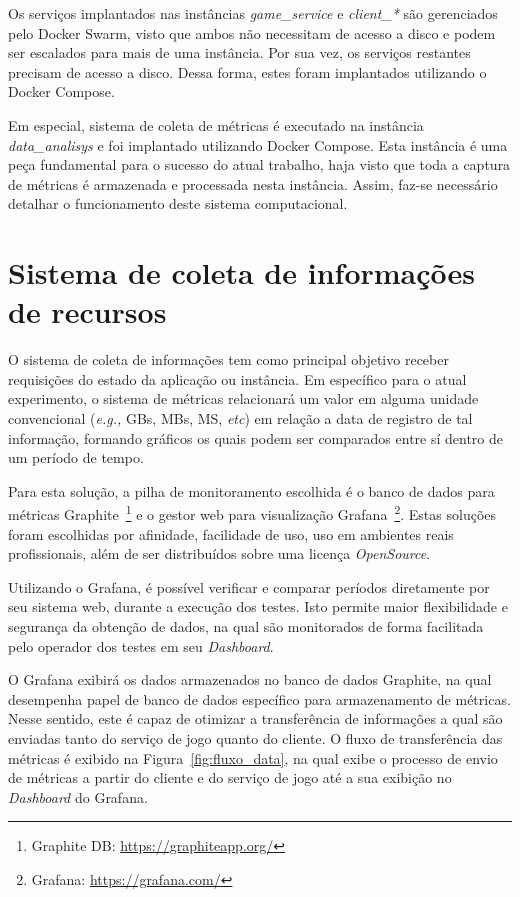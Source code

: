 Os serviços implantados nas instâncias \textit{game\_service} e \textit{client\_*} são gerenciados pelo Docker Swarm, visto que ambos não necessitam de acesso a disco e podem ser escalados para mais de uma instância.
%
Por sua vez, os serviços restantes precisam de acesso a disco. 
%
Dessa forma, estes foram implantados utilizando o Docker Compose.


Em especial, sistema de coleta de métricas é executado na instância \textit{data\_analisys} e foi implantado utilizando Docker Compose.
%
Esta instância é uma peça fundamental para o sucesso do atual trabalho, haja visto que toda a captura de métricas é armazenada e processada nesta instância.
%
Assim, faz-se necessário detalhar o funcionamento deste sistema computacional.


\section{Sistema de coleta de informações de recursos}
\label{sec:informacoes}

O sistema de coleta de informações tem como principal objetivo receber requisições do estado da aplicação ou instância.
%
Em específico para o atual experimento, o sistema de métricas relacionará um valor em alguma unidade convencional (\textit{e.g.,} GBs, MBs, MS, \textit{etc}) em relação a data de registro de tal informação, formando gráficos os quais podem ser comparados entre sí dentro de um período de tempo.

Para esta solução, a pilha de monitoramento escolhida é o banco de dados para métricas Graphite~\footnote{Graphite DB: \url{https://graphiteapp.org/}} e o gestor web para visualização Grafana~\footnote{Grafana: \url{https://grafana.com/}}.
%
Estas soluções foram escolhidas por afinidade, facilidade de uso, uso em ambientes reais profissionais, além de ser distribuídos sobre uma licença \textit{OpenSource}.


Utilizando o Grafana, é possível verificar e comparar períodos diretamente por seu sistema web, durante a execução dos testes.
%
Isto permite maior flexibilidade e segurança da obtenção de dados, na qual são monitorados de forma facilitada pelo operador dos testes em seu \textit{Dashboard}.

O Grafana exibirá os dados armazenados no banco de dados Graphite, na qual desempenha papel de banco de dados específico para armazenamento de métricas.
%
Nesse sentido, este é capaz de otimizar a transferência de informações a qual são enviadas tanto do serviço de jogo quanto do cliente.
%
O fluxo de transferência das métricas é exibido na Figura~\ref{fig:fluxo_data}, na qual exibe o processo de envio de métricas a partir do cliente e do serviço de jogo até a sua exibição no \textit{Dashboard} do Grafana.

